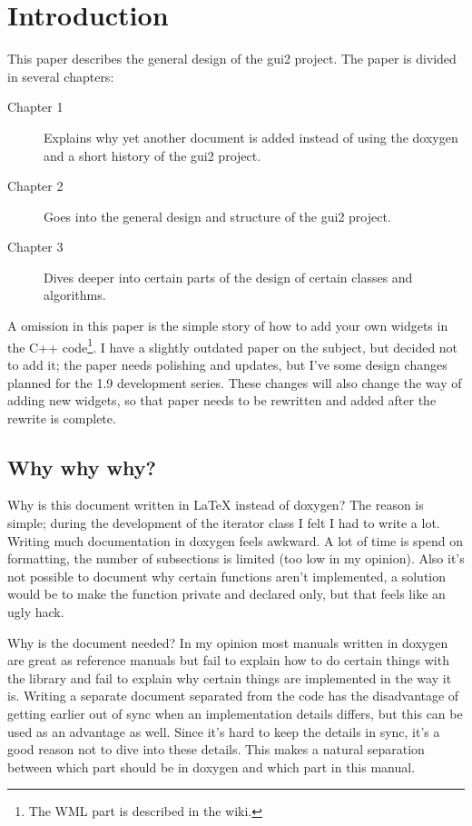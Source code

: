 \chapter{Introduction}

This paper describes the general design of the gui2 project. The paper is
divided in several chapters:
\begin{description}
\item[Chapter 1] Explains why yet another document is added instead of using the
	doxygen and a short history of the gui2 project.
\item[Chapter 2] Goes into the general design and structure of the gui2 project.
\item[Chapter 3] Dives deeper into certain parts of the design of certain
	classes and algorithms.
\end{description}

A omission in this paper is the simple story of how to add your own widgets in
the C++ code\footnote{The WML part is described in the wiki.}. I have a slightly
outdated paper on the subject, but decided not to add it; the paper needs
polishing and updates, but I've some design changes planned for the 1.9
development series. These changes will also change the way of adding new
widgets, so that paper needs to be rewritten and added after the rewrite is
complete.

\section{Why why why?}

Why is this document written in \LaTeX{} instead of doxygen? The reason is
simple; during the development of the iterator class I felt I had to write a
lot. Writing much documentation in doxygen feels awkward. A lot of time is spend
on formatting, the number of subsections is limited (too low in my opinion).
Also it's not possible to document why certain functions aren't implemented, a
solution would be to make the function private and declared only, but that feels
like an ugly hack.

Why is the document needed? In my opinion most manuals written in doxygen are
great as reference manuals but fail to explain how to do certain things with the
library and fail to explain why certain things are implemented in the way it is.
Writing a separate document separated from the code has the disadvantage of
getting earlier out of sync when an implementation details differs, but this can
be used as an advantage as well. Since it's hard to keep the details in sync,
it's a good reason not to dive into these details. This makes a natural
separation between which part should be in doxygen and which part in this
manual.

